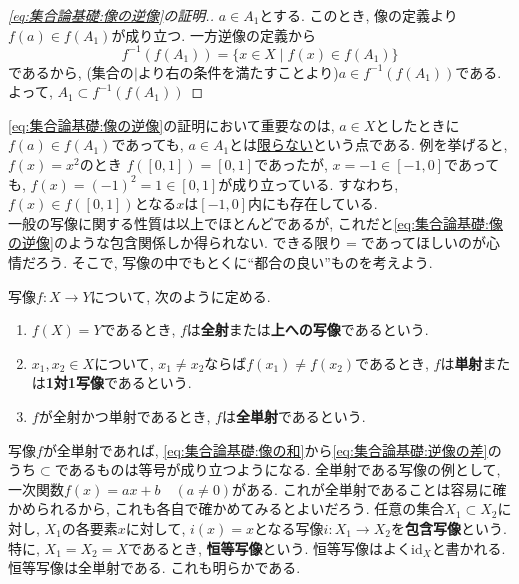 \documentclass[a4j,dvipdfmx]{jsarticle}
\numberwithin{equation}{section}
\begin{document}
            \begin{proof}[\eqref{eq:集合論基礎:像の逆像}の証明.]
                $a\in A_1$とする. このとき, 像の定義より$f(a)\in f(A_1)$が成り立つ. 一方逆像の定義から
                \begin{equation*}
                    f^{-1}(f(A_1))=\{x\in X\mid f(x)\in f(A_1)\}
                \end{equation*}
                であるから, (集合の$\mid$より右の条件を満たすことより)$a\in f^{-1}(f(A_1))$である. よって, $A_1\subset f^{-1}(f(A_1))$
            \end{proof}
            \eqref{eq:集合論基礎:像の逆像}の証明において重要なのは, $a\in X$としたときに$f(a)\in f(A_1)$であっても, $a\in A_1$とは\underline{限らない}という点である. 例を挙げると, $f(x)=x^2$のとき
            $f([0,1])=[0,1]$であったが, $x=-1\in [-1,0]$であっても, $f(x)=(-1)^2=1\in [0,1]$が成り立っている. すなわち, $f(x)\in f([0,1])$となる$x$は$[-1,0]$内にも存在している.\\

            一般の写像に関する性質は以上でほとんどであるが, これだと\eqref{eq:集合論基礎:像の逆像}のような包含関係しか得られない. できる限り$=$であってほしいのが心情だろう.
            そこで, 写像の中でもとくに``都合の良い''ものを考えよう.

            写像$f:X\rightarrow Y$について, 次のように定める.
            \begin{enumerate}
                \item $f(X)=Y$であるとき, $f$は\textbf{全射}または\textbf{上への写像}であるという.
                \item $x_1,x_2\in X$について, $x_1\neq x_2$ならば$f(x_1)\neq f(x_2)$であるとき, $f$は\textbf{単射}または\textbf{1対1写像}であるという.
                \item $f$が全射かつ単射であるとき, $f$は\textbf{全単射}であるという.
            \end{enumerate}
            写像$f$が全単射であれば, \eqref{eq:集合論基礎:像の和}から\eqref{eq:集合論基礎:逆像の差}のうち$\subset$であるものは等号が成り立つようになる. 
            全単射である写像の例として, 一次関数$f(x)=ax+b\quad (a\neq 0)$がある. これが全単射であることは容易に確かめられるから, これも各自で確かめてみるとよいだろう.
            \clearpage
            任意の集合$X_1\subset X_2$に対し, $X_1$の各要素$x$に対して, $i(x)=x$となる写像$i:X_1\rightarrow X_2$を\textbf{包含写像}という. 特に, $X_1=X_2=X$であるとき, 
            \textbf{恒等写像}という. 恒等写像はよく$\mathrm{id}_X$と書かれる. 恒等写像は全単射である. これも明らかである.\\
\end{document}
